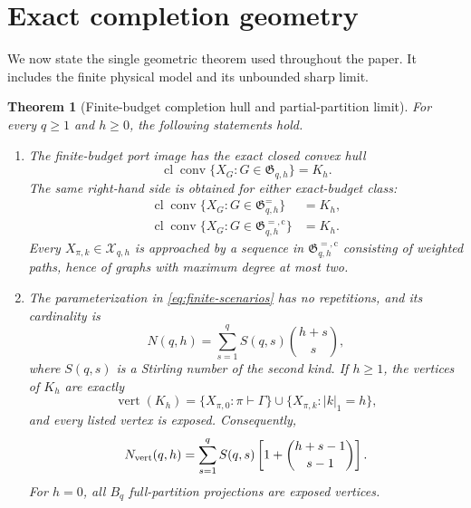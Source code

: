 \documentclass[journal,10pt]{IEEEtran}
\newtheorem{theorem}{Theorem}
\theoremstyle{definition}
\theoremstyle{remark}
\newcommand{\conv}{\operatorname{conv}}
\newcommand{\cl}{\operatorname{cl}}
\newcommand{\cX}{\mathcal X}
\newcommand{\fG}{\mathfrak G}
\begin{document}
\section{Exact completion geometry}

We now state the single geometric theorem used throughout the paper.  It
includes the finite physical model and its unbounded sharp limit.

\begin{theorem}[Finite-budget completion hull and partial-partition limit]
\label{thm:main}
For every $q\geq1$ and $h\geq0$, the following statements hold.

\begin{enumerate}[label=\textup{(\roman*)},leftmargin=2.1em]
\item The finite-budget port image has the exact closed convex hull
\begin{equation}
  \cl\conv\{X_G:G\in\fG_{q,h}\}=K_h.
  \label{eq:finite-hull}
\end{equation}
The same right-hand side is obtained for either exact-budget class:
\begin{equation}
 \begin{aligned}
  \cl\conv\{X_G:G\in\fG^{=}_{q,h}\}&=K_h,\\
  \cl\conv\{X_G:G\in\fG^{=,\mathrm c}_{q,h}\}&=K_h.
 \end{aligned}
 \label{eq:exact-budget-hulls}
\end{equation}
Every $X_{\pi,k}\in\cX_{q,h}$ is approached by a sequence in
$\fG^{=,\mathrm c}_{q,h}$ consisting of weighted paths, hence of graphs with
maximum degree at most two.

\item The parameterization in \eqref{eq:finite-scenarios} has no repetitions,
and its cardinality is
\begin{equation}
  N(q,h)=\sum_{s=1}^q S(q,s)\binom{h+s}{s},
  \label{eq:candidate-count}
\end{equation}
where $S(q,s)$ is a Stirling number of the second kind.  If $h\geq1$, the
vertices of $K_h$ are exactly
\begin{equation}
  \operatorname{vert}(K_h)
  =\{X_{\pi,0}:\pi\vdash\Gamma\}
   \cup
   \{X_{\pi,k}:|k|_1=h\},
  \label{eq:finite-vertices}
\end{equation}
and every listed vertex is exposed.  Consequently,
\begin{equation}
  N_{\rm vert}(q,h)
  =\sum_{s=1}^q S(q,s)
       \left[1+\binom{h+s-1}{s-1}\right].
  \label{eq:vertex-count}
\end{equation}
For $h=0$, all $B_q$ full-partition projections are exposed vertices.


\end{enumerate}
\end{theorem}
\end{document}
